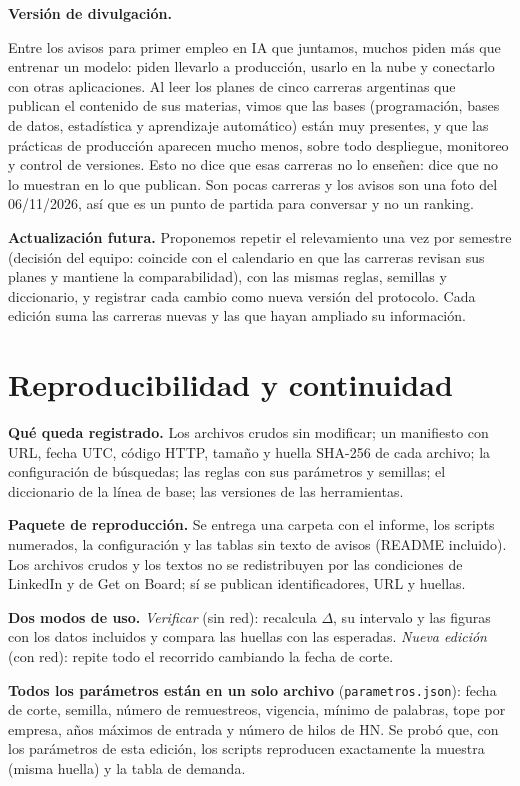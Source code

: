 \documentclass[11pt,a4paper]{article}
\begin{document}
\textbf{Versión de divulgación.}
\begin{caja}
Entre los avisos para primer empleo en IA que juntamos, muchos piden más que entrenar un modelo: piden llevarlo a producción, usarlo en la nube y conectarlo con otras aplicaciones. Al leer los planes de cinco carreras argentinas que publican el contenido de sus materias, vimos que las bases (programación, bases de datos, estadística y aprendizaje automático) están muy presentes, y que las prácticas de producción aparecen mucho menos, sobre todo despliegue, monitoreo y control de versiones. Esto no dice que esas carreras no lo enseñen: dice que no lo muestran en lo que publican. Son pocas carreras y los avisos son una foto del 06/11/2026, así que es un punto de partida para conversar y no un ranking.
\end{caja}

\textbf{Actualización futura.} Proponemos repetir el relevamiento una vez por semestre (decisión del equipo: coincide con el calendario en que las carreras revisan sus planes y mantiene la comparabilidad), con las mismas reglas, semillas y diccionario, y registrar cada cambio como nueva versión del protocolo. Cada edición suma las carreras nuevas y las que hayan ampliado su información.

\section{Reproducibilidad y continuidad}\label{sec:repro}
\textbf{Qué queda registrado.} Los archivos crudos sin modificar; un manifiesto con URL, fecha UTC, código HTTP, tamaño y huella SHA-256 de cada archivo; la configuración de búsquedas; las reglas con sus parámetros y semillas; el diccionario de la línea de base; las versiones de las herramientas.

\textbf{Paquete de reproducción.} Se entrega una carpeta con el informe, los scripts numerados, la configuración y las tablas sin texto de avisos (README incluido). Los archivos crudos y los textos no se redistribuyen por las condiciones de LinkedIn y de Get on Board; sí se publican identificadores, URL y huellas.

\textbf{Dos modos de uso.} \emph{Verificar} (sin red): recalcula $\Delta$, su intervalo y las figuras con los datos incluidos y compara las huellas con las esperadas. \emph{Nueva edición} (con red): repite todo el recorrido cambiando la fecha de corte.

\textbf{Todos los parámetros están en un solo archivo} (\texttt{parametros.json}): fecha de corte, semilla, número de remuestreos, vigencia, mínimo de palabras, tope por empresa, años máximos de entrada y número de hilos de HN. Se probó que, con los parámetros de esta edición, los scripts reproducen exactamente la muestra (misma huella) y la tabla de demanda.
\end{document}
